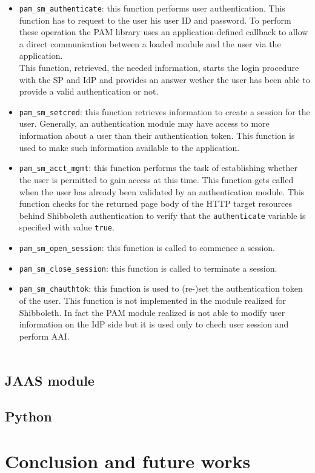 \begin{itemize}
\item \texttt{pam\_sm\_authenticate}: this function performs user authentication.
This function has to request to the user his user ID and password.
To perform these operation the PAM library uses an application-defined callback to allow a direct communication between a loaded module
and the user via the application.\\
This function, retrieved, the needed information, starts the login procedure with the SP and IdP and provides an answer wether the user
has been able to provide a valid authentication or not.
\item \texttt{pam\_sm\_setcred}: this function retrieves information to create a session for the user.
Generally, an authentication module may have access to more information about a user than their authentication token.
This function is used to make such information available to the application.
\item \texttt{pam\_sm\_acct\_mgmt}: this function performs the task of establishing whether the user is permitted to gain access at this time.
This function gets called when the user has already been validated by an authentication module.
This function checks for the returned page body of the HTTP target resources behind Shibboleth authentication to verify that the
\texttt{authenticate} variable is specified with value \texttt{true}.
\item \texttt{pam\_sm\_open\_session}: this function is called to commence a session.
\item \texttt{pam\_sm\_close\_session}: this function is called to terminate a session.
\item \texttt{pam\_sm\_chauthtok}: this function is used to (re-)set the authentication token of the user.
This function is not implemented in the module realized for Shibboleth.
In fact the PAM module realized is not able to modify user information on the IdP side but it is used only to chech user session and
perform AAI.\\
\\
\end{itemize}

\label{sec:jaas}
\subsection{JAAS module}

\label{sec:python}
\subsection{Python}

\label{sec:conclusion}
\section{Conclusion and future works}

